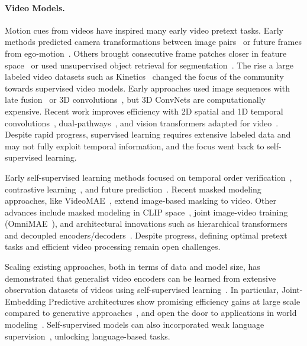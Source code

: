 \documentclass[]{fairmeta}
\begin{document}
\paragraph{\textbf{Video Models.}}

Motion cues from videos have inspired many early video pretext tasks. Early methods predicted camera transformations between image pairs~\citep{agrawal2015moving} or future frames from ego-motion~\citep{jayaraman2015ego}. Others brought consecutive frame patches closer in feature space~\citep{wang2015videos} or used unsupervised object retrieval for segmentation~\citep{pathak2017objects}. The rise a large labeled video datasets such as Kinetics~\citep{carreira2017quovadis} changed the focus of the community towards supervised video models. Early approaches used image sequences with late fusion~\citep{donahue2015long} or 3D convolutions~\citep{tran2015learning}, but 3D ConvNets are computationally expensive. Recent work improves efficiency with 2D spatial and 1D temporal convolutions~\citep{tran2018look, xie2018rethinking}, dual-pathways~\citep{feichtenhofer2019slowfast}, and vision transformers adapted for video~\citep{arnab2021vivit, bertasius2021spacetime}. Despite rapid progress, supervised learning requires extensive labeled data and may not fully exploit temporal information, and the focus went back to self-supervised learning.

Early self-supervised learning methods focused on temporal order verification~\citep{misra2016shuffle, xu2019self}, contrastive learning~\citep{han2020self, dave2022tclr}, and future prediction~\citep{han2019video}. Recent masked modeling approaches, like VideoMAE~\citep{tong2022videomae, feichtenhofer2022masl}, extend image-based masking to video. Other advances include masked modeling in CLIP space~\citep{li2023unmasked}, joint image-video training (OmniMAE~\citep{girdhar2023omnimae}), and architectural innovations such as hierarchical transformers~\citep{ryali2023hiera} and decoupled encoders/decoders~\citep{gupta2023decoupled}. Despite progress, defining optimal pretext tasks and efficient video processing remain open challenges.

Scaling existing approaches, both in terms of data and model size, has demonstrated that generalist video encoders can be learned from extensive observation datasets of videos using self-supervised learning~\citep{carreira2024scaling, wang2023videomae, rajasegaran2025empirical}. In particular, Joint-Embedding Predictive architectures show promising efficiency gains at large scale compared to generative approaches~\citep{bardes2024revisiting}, and open the door to applications in world modeling~\citep{assran2025v}. Self-supervised models can also incorporated weak language supervision~\citep{zhao2024videoprism, wang2024internvideo2, bolya2025perception}, unlocking language-based tasks.
\end{document}
